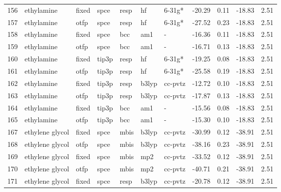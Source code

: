 \begin{tabular}{lllllllrrrr}
156 &                    ethylamine &  fixed &   spce &   resp &      hf &       6-31g* &      -20.29 &     0.11 &      -18.83 &      2.51 \\
157 &                    ethylamine &   otfp &   spce &   resp &      hf &       6-31g* &      -27.52 &     0.23 &      -18.83 &      2.51 \\
158 &                    ethylamine &  fixed &   spce &    bcc &     am1 &            - &      -16.36 &     0.11 &      -18.83 &      2.51 \\
159 &                    ethylamine &   otfp &   spce &    bcc &     am1 &            - &      -16.71 &     0.13 &      -18.83 &      2.51 \\
160 &                    ethylamine &  fixed &  tip3p &   resp &      hf &       6-31g* &      -19.25 &     0.08 &      -18.83 &      2.51 \\
161 &                    ethylamine &   otfp &  tip3p &   resp &      hf &       6-31g* &      -25.58 &     0.19 &      -18.83 &      2.51 \\
162 &                    ethylamine &  fixed &  tip3p &   resp &   b3lyp &      cc-pvtz &      -12.72 &     0.10 &      -18.83 &      2.51 \\
163 &                    ethylamine &   otfp &  tip3p &   resp &   b3lyp &      cc-pvtz &      -17.87 &     0.13 &      -18.83 &      2.51 \\
164 &                    ethylamine &  fixed &  tip3p &    bcc &     am1 &            - &      -15.56 &     0.08 &      -18.83 &      2.51 \\
165 &                    ethylamine &   otfp &  tip3p &    bcc &     am1 &            - &      -15.30 &     0.10 &      -18.83 &      2.51 \\
167 &               ethylene glycol &  fixed &   spce &   mbis &   b3lyp &      cc-pvtz &      -30.99 &     0.12 &      -38.91 &      2.51 \\
168 &               ethylene glycol &   otfp &   spce &   mbis &   b3lyp &      cc-pvtz &      -38.16 &     0.23 &      -38.91 &      2.51 \\
169 &               ethylene glycol &  fixed &   spce &   mbis &     mp2 &      cc-pvtz &      -33.52 &     0.12 &      -38.91 &      2.51 \\
170 &               ethylene glycol &   otfp &   spce &   mbis &     mp2 &      cc-pvtz &      -40.71 &     0.21 &      -38.91 &      2.51 \\
171 &               ethylene glycol &  fixed &   spce &   resp &   b3lyp &      cc-pvtz &      -20.78 &     0.12 &      -38.91 &      2.51 \\

\end{tabular}
